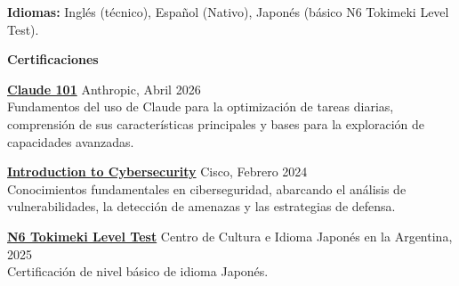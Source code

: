 \documentclass[11pt]{article}
\begin{document}
\textbf{Idiomas:} Inglés (técnico), Español (Nativo), Japonés (básico N6 Tokimeki Level Test). 

\newpage

\begin{center}
    \textbf{Certificaciones} 
\end{center}

\href{https://verify.skilljar.com/c/58u875uhh4rp}{\textbf{Claude 101}} \hfill Anthropic, Abril 2026 \\
Fundamentos del uso de Claude para la optimización de tareas diarias, comprensión de sus características principales y bases para la exploración de capacidades avanzadas.

\vspace{12pt}

\href{https://www.credly.com/badges/76745fcb-3f49-4047-a15a-ed79393a3a26/}{\textbf{Introduction to Cybersecurity}} \hfill Cisco, Febrero 2024 \\
Conocimientos fundamentales en ciberseguridad, abarcando el análisis de vulnerabilidades, la detección de amenazas y las estrategias de defensa.

\vspace{12pt}

\href{}{\textbf{N6 Tokimeki Level Test}} \hfill Centro de Cultura e Idioma Japonés en la Argentina, 2025 \\
Certificación de nivel básico de idioma Japonés.

\vspace{12pt}
\end{document}
